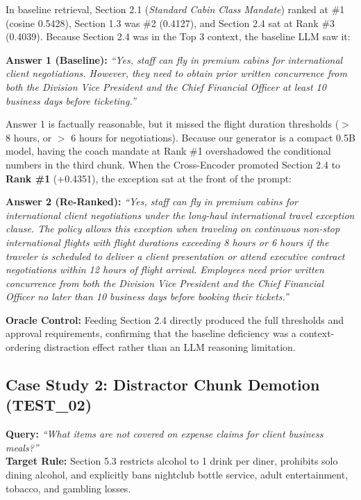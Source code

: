 \documentclass[11pt,a4paper]{article}
\newenvironment{answerquote}{%
  \begin{list}{}{%
    \setlength{\leftmargin}{1.0em}%
    \setlength{\rightmargin}{1.0em}%
    \setlength{\topsep}{2pt}%
    \setlength{\partopsep}{0pt}%
    \setlength{\parsep}{0pt}%
    \setlength{\itemsep}{0pt}%
  }%
  \item\small\itshape
}{%
  \end{list}%
}
\begin{document}
In baseline retrieval, Section 2.1 (\textit{Standard Cabin Class Mandate}) ranked at \#1 (cosine 0.5428), Section 1.3 was \#2 (0.4127), and Section 2.4 sat at Rank \#3 (0.4039). Because Section 2.4 was in the Top 3 context, the baseline LLM saw it:
\begin{answerquote}
\textbf{Answer 1 (Baseline):} \textit{``Yes, staff can fly in premium cabins for international client negotiations. However, they need to obtain prior written concurrence from both the Division Vice President and the Chief Financial Officer at least 10 business days before ticketing.''}
\end{answerquote}
Answer 1 is factually reasonable, but it missed the flight duration thresholds ($>$ 8 hours, or $>$ 6 hours for negotiations). Because our generator is a compact 0.5B model, having the coach mandate at Rank \#1 overshadowed the conditional numbers in the third chunk. When the Cross-Encoder promoted Section 2.4 to \textbf{Rank \#1} (+0.4351), the exception sat at the front of the prompt:
\begin{answerquote}
\textbf{Answer 2 (Re-Ranked):} \textit{``Yes, staff can fly in premium cabins for international client negotiations under the long-haul international travel exception clause. The policy allows this exception when traveling on continuous non-stop international flights with flight durations exceeding 8 hours or 6 hours if the traveler is scheduled to deliver a client presentation or attend executive contract negotiations within 12 hours of flight arrival. Employees need prior written concurrence from both the Division Vice President and the Chief Financial Officer no later than 10 business days before booking their tickets.''}
\end{answerquote}
\textbf{Oracle Control:} Feeding Section 2.4 directly produced the full thresholds and approval requirements, confirming that the baseline deficiency was a context-ordering distraction effect rather than an LLM reasoning limitation.

\subsection{Case Study 2: Distractor Chunk Demotion (TEST\_02)}
\textbf{Query:} \textit{``What items are not covered on expense claims for client business meals?''}\\
\textbf{Target Rule:} Section 5.3 restricts alcohol to 1 drink per diner, prohibits solo dining alcohol, and explicitly bans nightclub bottle service, adult entertainment, tobacco, and gambling losses.
\end{document}
